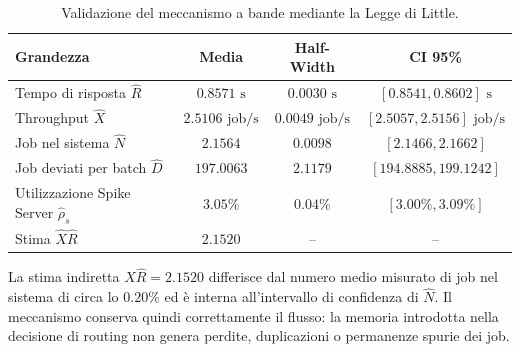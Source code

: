 ﻿\documentclass[a4paper,12pt]{article}
\begin{document}
\begin{table}[H]
    \centering
    \small
    \renewcommand{\arraystretch}{1.25}
    \begin{tabular}{lccc}
        \hline
        \textbf{Grandezza} & \textbf{Media} & \textbf{Half-Width} & \textbf{CI 95\%} \\ \hline
        Tempo di risposta $\hat{R}$ & $0.8571\text{ s}$ & $0.0030\text{ s}$ & $[0.8541,0.8602]\text{ s}$ \\
        Throughput $\hat{X}$ & $2.5106\text{ job/s}$ & $0.0049\text{ job/s}$ & $[2.5057,2.5156]\text{ job/s}$ \\
        Job nel sistema $\hat{N}$ & $2.1564$ & $0.0098$ & $[2.1466,2.1662]$ \\
        Job deviati per batch $\hat{D}$ & $197.0063$ & $2.1179$ & $[194.8885,199.1242]$ \\
        Utilizzazione Spike Server $\hat{\rho}_s$ & $3.05\%$ & $0.04\%$ & $[3.00\%,3.09\%]$ \\
        Stima $\hat{X}\hat{R}$ & $2.1520$ & -- & -- \\ \hline
    \end{tabular}
    \caption{Validazione del meccanismo a bande mediante la Legge di Little.}
    \label{tab:band_validation}
\end{table}

La stima indiretta $\hat{X}\hat{R}=2.1520$ differisce dal numero medio misurato di job nel sistema di circa lo $0.20\%$ ed è interna all'intervallo di confidenza di $\hat{N}$. Il meccanismo conserva quindi correttamente il flusso: la memoria introdotta nella decisione di routing non genera perdite, duplicazioni o permanenze spurie dei job.
\end{document}
